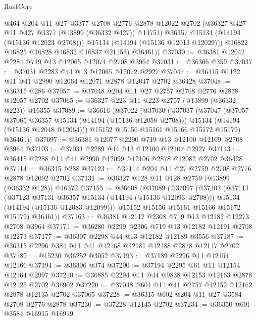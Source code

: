 \begin{lexlean}{RustCore}
\begin{coremodule}
              @464
              @204
              @11
              @27
              @3377
              @2708
              @2776
              @2878
              @12022
              @2702
              (@36327 @427 @11 @427 @3377 (@13899 (@36332 @427)) @14751)
              @36357
              @15134
              (@14194 (@15136 @12023 @2708)))
            @15134
            (@14194 (@15136 @12013 @12029)))
          @16822
          @16825
          @16828
          @16832
          @16837
          @21153)
        @36461))
@37030 := @36381 @12042 @2284 @719 @13 @12065 @12074 @2708 @3964
@37031 := @36306 @359
@37037 := @37031 @2283 @44 @13 @12065 @12072 @2927
@37047 := @36415 @1122 @11 @41 @2990 @12064 @12071 @2878 @12047 @2702 @36428
@37048 := @36315 @286
@37057 := @37048 @204 @11 @27 @2757 @2708 @2776 @2878 @12057 @2702
@37065 := @36327 @223 @11 @223 @2757 (@13899 (@36332 @223)) @16355
@37089 := @36616
    (@37022
      (@37030
        (@37037
          (@37047
            (@37057 @37065 @36357 @15134 (@14194 (@15136 @12058 @2708)))
            @15134
            (@14194 (@15136 @12048 @12064)))
          @15152
          @15156
          @15161
          @15166
          @15172
          @15179)
        @36461))
@37097 := @36381 @12077 @2290 @719 @13 @12100 @12109 @2708 @3964
@37103 := @37031 @2289 @44 @13 @12100 @12107 @2927
@37113 := @36415 @2288 @11 @41 @2990 @12099 @12106 @2878 @12082 @2702 @36428
@37114 := @36315 @288
@37123 := @37114 @204 @11 @27 @2759 @2708 @2776 @2878 @12092 @2702
@37131 := @36327 @128 @11 @128 @2759 (@13899 (@36332 @128)) @16372
@37155 := @36608
    (@37089
      (@37097
        (@37103
          (@37113
            (@37123 @37131 @36357 @15134 (@14194 (@15136 @12093 @2708)))
            @15134
            (@14194 (@15136 @12083 @12099)))
          @15152
          @15156
          @15161
          @15166
          @15172
          @15179)
        @36461))
@37163 := @36381 @12112 @2308 @719 @13 @12182 @12273 @2708 @3964
@37171 := @36280 @2299 @2306 @719 @13 @12182 @12191 @2708 @12273
@37177 := @36307 @2298 @44 @13 @12182 @12189 @3556
@37187 := @36315 @2296 @384 @11 @41 @12168 @12181 @12188 @2878 @12117 @2702
@37189 := @15230 @36252 @3052
@37193 := @37189 @2296 @11 @12154 @12166
@37194 := @36306 @374
@37200 := @37194 @2295 @61 @11 @12154 @12164 @2997
@37210 := @36885 @2294 @11 @44 @9838 @12153 @12163 @2878 @12125 @2702 @36902
@37220 := @37048 @604 @11 @41 @2757 @12152 @12162 @2878 @12135 @2702 @37065
@37228 := @36315 @602 @204 @11 @27 @3584 @2708 @2776 @2878
@37230 := @37228 @12145 @2702
@37234 := @36350 @601 @3584 @16915 @16919

\end{coremodule}
\end{lexlean}
